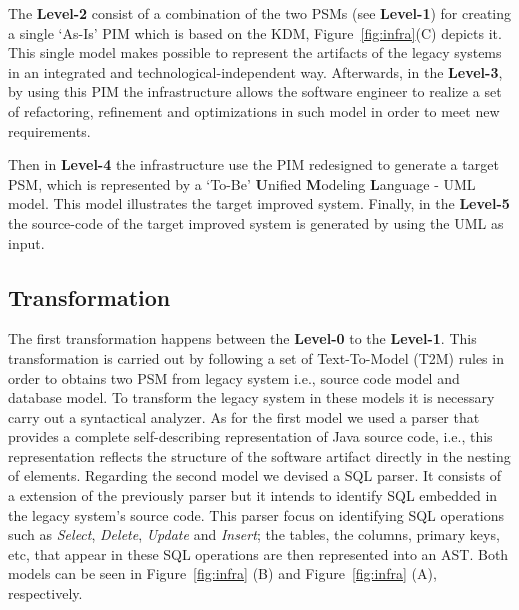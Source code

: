 The \textbf{Level-2} consist of a combination of the two PSMs (see \textbf{Level-1}) for creating a single `As-Is' PIM which is based on the KDM, Figure~\ref{fig:infra}(C) depicts it. This single model makes possible to represent the artifacts of the legacy systems in an integrated and technological-independent way. %
Afterwards, in the \textbf{Level-3}, by using this PIM the infrastructure allows the software engineer to realize a set of refactoring, refinement and optimizations in such model in order to meet new requirements. %

Then in \textbf{Level-4} the infrastructure use the PIM redesigned to generate a target PSM, which is represented by a `To-Be' \textbf{U}nified \textbf{M}odeling \textbf{L}anguage - UML model. This model illustrates the target improved system. Finally, in the \textbf{Level-5} the source-code of the target improved system is generated by using the UML as input.

\subsection{Transformation}\label{subsection:transformation}

The first transformation happens between the \textbf{Level-0} to the \textbf{Level-1}. This transformation is carried out by following a set of Text-To-Model (T2M) rules in order to obtains two PSM from legacy system i.e., source code model and database model. To transform the legacy system in these models it is necessary carry out a syntactical analyzer. As for the first model we used a parser that provides a complete self-describing representation of Java source code, i.e., this representation reflects the structure of the software artifact directly in the nesting of elements. Regarding the second model we devised a SQL parser. It consists of a extension of the previously parser but it intends to identify SQL embedded in the legacy system's source code. This parser focus on identifying SQL operations such as \textit{Select}, \textit{Delete}, \textit{Update} and \textit{Insert}; the tables, the columns, primary keys, etc, that appear in these SQL operations are then represented into an AST. Both models can be seen in Figure~\ref{fig:infra} (B) and Figure~\ref{fig:infra} (A), respectively. 

